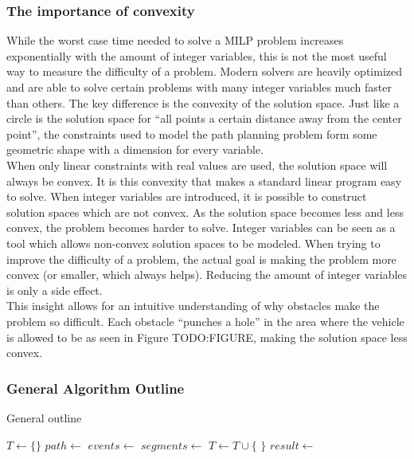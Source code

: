 \subsubsection{The importance of convexity}
While the worst case time needed to solve a MILP problem increases exponentially with the amount of integer variables, this is not the most useful way to measure the difficulty of a problem. Modern solvers are heavily optimized and are able to solve certain problems with many integer variables much faster than others. The key difference is the convexity of the solution space. Just like a circle is the solution space for ``all points a certain distance away from the center point'', the constraints used to model the path planning problem form some geometric shape with a dimension for every variable. \\
When only linear constraints with real values are used, the solution space will always be convex. It is this convexity that makes a standard linear program easy to solve. When integer variables are introduced, it is possible to construct solution spaces which are not convex. As the solution space becomes less and less convex, the problem becomes harder to solve. Integer variables can be seen as a tool which allows non-convex solution spaces to be modeled. When trying to improve the difficulty of a problem, the actual goal is making the problem more convex (or smaller, which always helps). Reducing the amount of integer variables is only a side effect. \\
This insight allows for an intuitive understanding of why obstacles make the problem so difficult. Each obstacle ``punches a hole'' in the area where the vehicle is allowed to be as seen in Figure TODO:FIGURE, making the solution space less convex.

\subsubsection{General Algorithm Outline}
\begin{algorithm}
\caption{General outline}
\label{alg:outline}
\begin{algorithmic}[1]
\State $T \leftarrow \{\}$ 
\State $path \leftarrow$ 
\State $events \leftarrow$ 
\State $segments \leftarrow$ 
\State {}
\State {}
\State $T \leftarrow T \cup \{$  $\}$
\EndFor
\State $result \leftarrow $
\end{algorithmic}
\end{algorithm}


